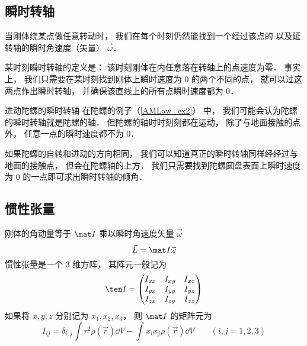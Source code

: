 

\subsection{瞬时转轴}
当刚体绕某点做任意转动时， 我们在每个时刻仍然能找到一个经过该点的 以及延转轴的瞬时角速度（矢量） $\vec \omega$．

某时刻瞬时转轴的定义是： 该时刻刚体在内任意落在转轴上的点速度为零． 事实上， 我们只需要在某时刻找到刚体上瞬时速度为 0 的两个不同的点， 就可以过这两点作出瞬时转轴， 并确保该直线上的所有点瞬时速度都为 0．

\begin{exam}{进动陀螺的瞬时转轴}
在陀螺的例子（\autoref{AMLaw_ex2}） 中， 我们可能会认为陀螺的瞬时转轴就是陀螺的轴． 但陀螺的轴时时刻刻都在运动， 除了与地面接触的点外， 任意一点的瞬时速度都不为 0．

如果陀螺的自转和进动的方向相同， 我们可以知道真正的瞬时转轴同样经经过与地面的接触点， 但会在陀螺轴的上方． 我们只需要找到陀螺圆盘表面上瞬时速度为 0 的一点即可求出瞬时转轴的倾角．
\end{exam}

\subsection{惯性张量}
刚体的角动量等于 $\mat I$ 乘以瞬时角速度矢量 $\vec \omega$
\begin{equation}
\vec L = \mat I \vec \omega
\end{equation}
惯性张量是一个 3 维方阵， 其阵元一般记为
\begin{equation}
\ten I = \begin{pmatrix}
I_{xx}& I_{xy}& I_{xz} \\
I_{yx}& I_{yy}& I_{yz} \\
I_{zx}& I_{zy}& I_{zz}
\end{pmatrix}
\end{equation}
如果将 $x, y, z$ 分别记为 $x_1, x_2, x_3$， 则 $\mat I$ 的矩阵元为
\begin{equation}
I_{ij} = \delta_{i, j} \int r^2 \rho(\vec r)\dd{V} - \int x_i x_j \rho(\vec r)\dd{V} \qquad (i, j = 1, 2, 3)
\end{equation}

